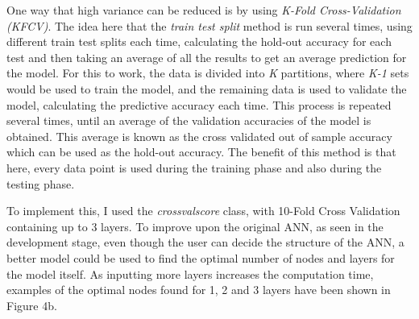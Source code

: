 \documentclass[11pt]{article}
\begin{document}
One way that high variance can be reduced is by using \textit{K-Fold Cross-Validation (KFCV)}. The idea here that the \textit{train test split} method is run several times, using different train test splits each time, calculating the hold-out accuracy for each test and then taking an average of all the results to get an average prediction for the model. For this to work, the data is divided into \textit{K} partitions, where \textit{K-1} sets would be used to train the model, and the remaining data is used to validate the model, calculating the predictive accuracy each time. This process is repeated several times, until an average of the validation accuracies of the model is obtained. This average is known as the cross validated out of sample accuracy which can be used as the hold-out accuracy.  The benefit of this method is that here, every data point is used during the training phase and also during the testing phase.

To implement this, I used the \textit{cross\textunderscore val\textunderscore score} class, with 10-Fold Cross Validation containing up to 3 layers. To improve upon the original ANN, as seen in the development stage, even though the user can decide the structure of the ANN, a better model could be used to find the optimal number of nodes and layers for the model itself. As inputting more layers increases the computation time, examples of the optimal nodes found for 1, 2 and 3 layers have been shown in Figure 4b. 
\end{document}

